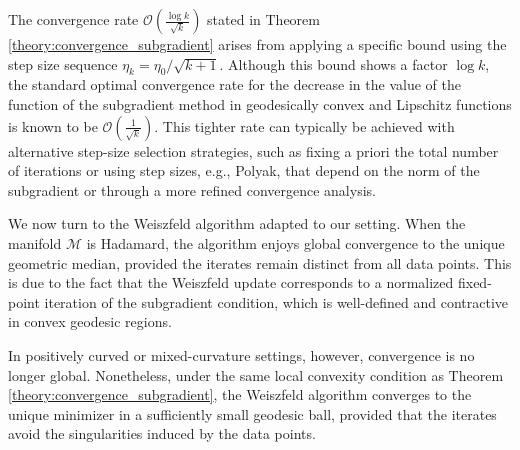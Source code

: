\documentclass[10pt]{article}
\newcommand{\calM}{\mathcal{M}}
\begin{document}
The convergence rate $\mathcal{O}\left(\frac{\log k}{\sqrt{k}}\right)$ stated in Theorem \ref{theory:convergence_subgradient} arises from applying a specific bound using the step size sequence $\eta_k = \eta_0/\sqrt{k+1}$. Although this bound shows a factor $\log k$, the standard optimal convergence rate for the decrease in the value of the function of the subgradient method in geodesically convex and Lipschitz functions is known to be $\mathcal{O}\left(\frac{1}{\sqrt{k}}\right)$. This tighter rate can typically be achieved with alternative step-size selection strategies, such as fixing a priori the total number of iterations or using step sizes, e.g., Polyak, that depend on the norm of the subgradient or through a more refined convergence analysis.






We now turn to the Weiszfeld algorithm adapted to our setting. When the manifold $\calM$ is Hadamard, the algorithm enjoys global convergence to the unique geometric median, provided the iterates remain distinct from all data points. This is due to the fact that the Weiszfeld update corresponds to a normalized fixed-point iteration of the subgradient condition, which is well-defined and contractive in convex geodesic regions.

In positively curved or mixed-curvature settings, however, convergence is no longer global. Nonetheless, under the same local convexity condition as Theorem \ref{theory:convergence_subgradient}, the Weiszfeld algorithm converges to the unique minimizer in a sufficiently small geodesic ball, provided that the iterates avoid the singularities induced by the data points.
\end{document}
